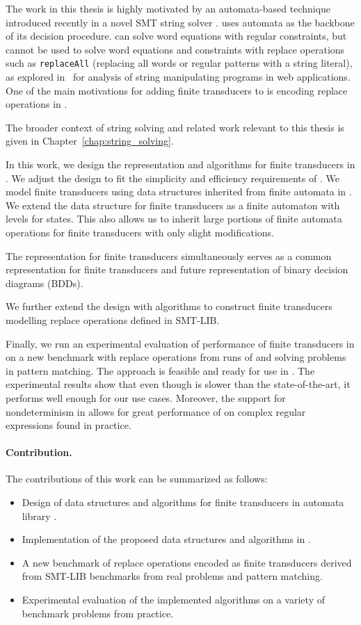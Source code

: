The work in this thesis is highly motivated by an automata-based technique introduced recently in a novel SMT string solver \noodler.
\noodler uses automata as the backbone of its decision procedure.
\noodler can solve word equations with regular constraints, but cannot be used to solve word equations and constraints with replace operations such as \texttt{replaceAll} (replacing all words or regular patterns with a string literal), as explored in~\cite{10.1145/3158091} for analysis of string manipulating programs in web applications.
One of the main motivations for adding finite transducers to \mata is encoding replace operations in \noodler.

The broader context of string solving and related work relevant to this thesis is given in Chapter~\ref{chap:string_solving}.

In this work, we design the representation and algorithms for finite transducers in \mata.
We adjust the design to fit the simplicity and efficiency requirements of \mata.
We model finite transducers using data structures inherited from finite automata in \mata.
We extend the data structure for finite transducers as a finite automaton with levels for states.
This also allows us to inherit large portions of finite automata operations for finite transducers with only slight modifications.

The representation for finite transducers simultaneously serves as a common representation for finite transducers and future representation of binary decision diagrams (BDDs).

We further extend the design with algorithms to construct finite transducers modelling replace operations defined in SMT-LIB.

Finally, we run an experimental evaluation of performance of finite transducers in \mata on a new benchmark with replace operations from runs of \noodler and solving problems in pattern matching.
The approach is feasible and ready for use in \noodler.
The experimental results show that even though \mata is slower than the state-of-the-art, it performs well enough for our use cases.
Moreover, the support for nondeterminism in \mata allows for great performance of \nfts on complex regular expressions found in practice.
\newpage
\paragraph{Contribution.}
The contributions of this work can be summarized as follows:
\begin{itemize}
  \item Design of data structures and algorithms for finite transducers in automata library \mata.
  \item Implementation of the proposed data structures and algorithms in \mata.
  \item A new benchmark of replace operations encoded as finite transducers derived from SMT-LIB benchmarks from real problems and pattern matching.
  \item Experimental evaluation of the implemented algorithms on a variety of benchmark problems from practice.
\end{itemize}

